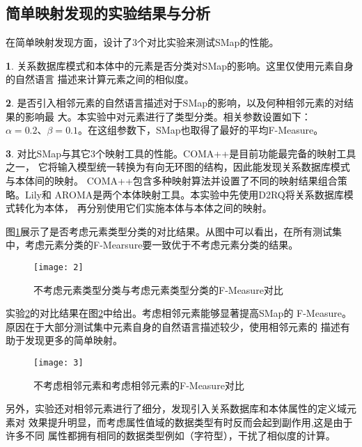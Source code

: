 \subsection{简单映射发现的实验结果与分析}
在简单映射发现方面，设计了3个对比实验来测试SMap的性能。

\theoremstyle{definition}
\newtheorem{experiment}{}
\begin{experiment}
关系数据库模式和本体中的元素是否分类对SMap的影响。这里仅使用元素自身的自然语言
描述来计算元素之间的相似度。
\end{experiment}

\begin{experiment}
\label{exp2}
是否引入相邻元素的自然语言描述对于SMap的影响，以及何种相邻元素的对结果的影响最
大。本实验中对元素进行了类型分类。相关参数设置如下：
$\alpha=0.2 \mbox{、}\beta=0.1$。在这组参数下，SMap也取得了最好的平均F-Measure。
\end{experiment}

\begin{experiment}
对比SMap与其它3个映射工具的性能。COMA++\cite{21}是目前功能最完备的映射工具之一，
它将输入模型统一转换为有向无环图的结构，因此能发现关系数据库模式与本体间的映射。
COMA++包含多种映射算法并设置了不同的映射结果组合策略。Lily\cite{22}和
AROMA\cite{23}是两个本体映射工具。本实验中先使用D2RQ将关系数据库模式转化为本体，
再分别使用它们实施本体与本体之间的映射。
\end{experiment}

图\ref{fig2}展示了是否考虑元素类型分类的对比结果。从图中可以看出，在所有测试集
中，考虑元素分类的F-Mearsure要一致优于不考虑元素分类的结果。
\begin{figure}[htbp]
\centerline{\texttt{[image: 2]}}
\caption{不考虑元素类型分类与考虑元素类型分类的F-Measure对比}
\label{fig2}
\end{figure}

实验\ref{exp2}的对比结果在图\ref{fig3}中给出。考虑相邻元素能够显著提高SMap的
F-Measure。原因在于大部分测试集中元素自身的自然语言描述较少，使用相邻元素的
描述有助于发现更多的简单映射。

\begin{figure}[htbp]
\centerline{\texttt{[image: 3]}}
\caption{不考虑相邻元素和考虑相邻元素的F-Measure对比}
\label{fig3}
\end{figure}

另外，实验还对相邻元素进行了细分，发现引入关系数据库和本体属性的定义域元素对
效果提升明显，而考虑属性值域的数据类型有时反而会起到副作用,这是由于许多不同
属性都拥有相同的数据类型例如（字符型），干扰了相似度的计算。

